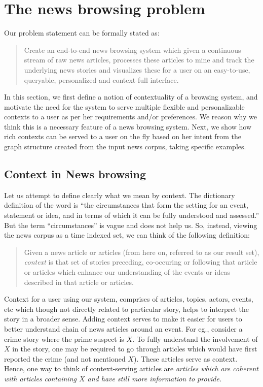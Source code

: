 \section{The news browsing problem}
\label{sec:newsgraph}

Our problem statement can be formally stated as:
\begin{quote}
  Create an end-to-end news browsing system which given a
  continuous stream of raw news articles, processes these articles to
  mine and track the underlying news stories and visualizes these for
  a user on an easy-to-use, queryable, personalized and context-full
  interface.
\end{quote}
In this section, we first define a notion of contextuality of a browsing system, and motivate the need for the system to serve multiple flexible and personalizable contexts to a user as per her
requirements and/or preferences. We reason why we think this is a necessary feature of a news browsing system. Next, we show how rich contexts can be served to a user on the fly based on her intent
from the graph structure created from the input news corpus, taking specific examples. 

\subsection{Context in News browsing}
Let us attempt to define clearly what we mean by context. The
dictionary definition of the word is ``the circumstances that form the
setting for an event, statement or idea, and in terms of which it can
be fully understood and assessed.'' But the term ``circumstances'' is
vague and does not help us. So, instead, viewing the news corpus as a
time indexed set, we can think of the following definition: 
\begin{quote}
Given a news article or articles (from here on, referred to as our result set), {\em context} is that set of stories
preceding, co-occuring or following that article or articles which
enhance our understanding of the events or ideas described in that
article or articles.
\end{quote}

Context for a user using our system, comprises of articles, topics,
actors, events, etc which though not directly related to particular
story, helps to interpret the story in a broader sense.  Adding
context serves to make it easier for users to better understand chain
of news articles around an event. For eg., consider a crime story
where the prime suspect is $X$. To fully understand the involvement of $X$ in the story,
one may be required to go through articles which would have first reported the crime (and not 
mentioned $X$). These articles serve as context. Hence, one way to think of context-serving articles
are \emph{articles which are coherent with articles containing $X$ and have still more information to provide.}

